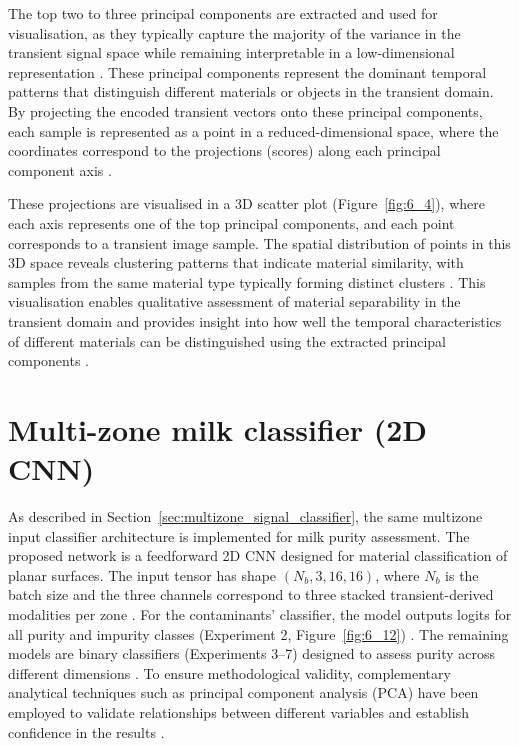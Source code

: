 \documentclass[12pt,a4paper,oneside]{report}
\let\oldsection\section
\renewcommand{\section}{\clearpage\oldsection}
\begin{document}
The top two to three principal components are extracted and used for visualisation, as they typically capture the majority of the variance in the transient signal space while remaining interpretable in a low-dimensional representation \cite{wold1987}. These principal components represent the dominant temporal patterns that distinguish different materials or objects in the transient domain. By projecting the encoded transient vectors onto these principal components, each sample is represented as a point in a reduced-dimensional space, where the coordinates correspond to the projections (scores) along each principal component axis \cite{bishop2006}.

These projections are visualised in a 3D scatter plot (Figure~\ref{fig:6_4}), where each axis represents one of the top principal components, and each point corresponds to a transient image sample. The spatial distribution of points in this 3D space reveals clustering patterns that indicate material similarity, with samples from the same material type typically forming distinct clusters \cite{chandra2024}. This visualisation enables qualitative assessment of material separability in the transient domain and provides insight into how well the temporal characteristics of different materials can be distinguished using the extracted principal components \cite{wold1987,bishop2006}.

\newpage
\section{Multi-zone milk classifier (2D CNN)}
\label{sec:multi_zone_milk_classifier_chapter6}

As described in Section~\ref{sec:multizone_signal_classifier}, the same multizone input classifier architecture is implemented for milk purity assessment. The proposed network is a feedforward 2D CNN designed for material classification of planar surfaces. The input tensor has shape $(N_b, 3, 16, 16)$, where $N_b$ is the batch size and the three channels correspond to three stacked transient-derived modalities per zone \cite{su2016,lecun1998}. For the contaminants' classifier, the model outputs logits for all purity and impurity classes (Experiment 2, Figure~\ref{fig:6_12}) \cite{bishop2006}. The remaining models are binary classifiers (Experiments 3--7) designed to assess purity across different dimensions \cite{bishop2006}. To ensure methodological validity, complementary analytical techniques such as principal component analysis (PCA) have been employed to validate relationships between different variables and establish confidence in the results \cite{wold1987,chandra2024}.
\end{document}
